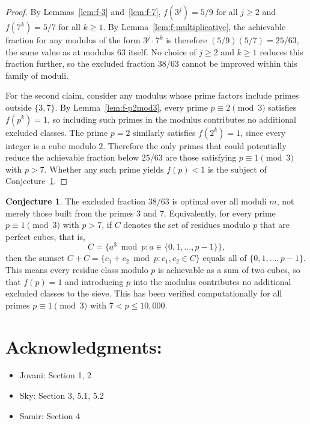 \documentclass[12pt]{amsart}
\theoremstyle{definition}
\newtheorem{conjecture}[theorem]{Conjecture}
\theoremstyle{remark}
\begin{document}
\begin{proof}
By Lemmas~\ref{lem:f-3} and~\ref{lem:f-7}, $f(3^j) = 5/9$ for all 
$j \ge 2$ and $f(7^k) = 5/7$ for all $k \ge 1$. By 
Lemma~\ref{lem:f-multiplicative}, the achievable fraction for any 
modulus of the form $3^j \cdot 7^k$ is therefore 
$(5/9)(5/7) = 25/63$, the same value as at modulus $63$ itself. No 
choice of $j \ge 2$ and $k \ge 1$ reduces this fraction further, so 
the excluded fraction $38/63$ cannot be improved within this family 
of moduli.

For the second claim, consider any modulus whose prime factors include 
primes outside $\{3, 7\}$. By Lemma~\ref{lem:f-p2mod3}, every prime 
$p \equiv 2 \pmod{3}$ satisfies $f(p^k) = 1$, so including such 
primes in the modulus contributes no additional excluded classes. The 
prime $p = 2$ similarly satisfies $f(2^k) = 1$, since every integer 
is a cube modulo $2$. Therefore the only primes that could potentially 
reduce the achievable fraction below $25/63$ are those satisfying 
$p \equiv 1 \pmod{3}$ with $p > 7$. Whether any such prime yields 
$f(p) < 1$ is the subject of Conjecture~\ref{conj:optimal}.
\end{proof}

\begin{conjecture}\label{conj:optimal}
The excluded fraction $38/63$ is optimal over all moduli $m$, not 
merely those built from the primes $3$ and $7$. Equivalently, for 
every prime $p \equiv 1 \pmod{3}$ with $p > 7$, if $C$ denotes the 
set of residues modulo $p$ that are perfect cubes, that is,
\[
C = \{a^3 \bmod p : a \in \{0, 1, \ldots, p-1\}\},
\]
then the sumset $C + C = \{c_1 + c_2 \bmod p : c_1, c_2 \in C\}$ 
equals all of $\{0, 1, \ldots, p-1\}$. This means every residue class 
modulo $p$ is achievable as a sum of two cubes, so that $f(p) = 1$ 
and introducing $p$ into the modulus contributes no additional 
excluded classes to the sieve. This has been verified computationally 
for all primes $p \equiv 1 \pmod{3}$ with $7 < p \le 10{,}000$.
\end{conjecture}
\section{Acknowledgments:}
\begin{itemize}
    \item Jovani: Section 1, 2
    \item Sky: Section 3, 5.1, 5.2
    \item Samir: Section 4
\end{itemize}
\end{document}
